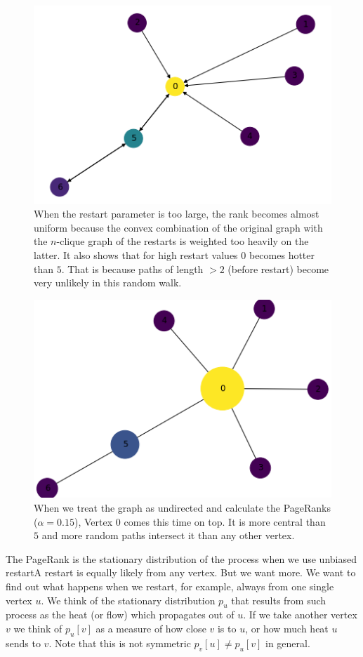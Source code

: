 \documentclass[a4paper,10pt]{article}
\newcommand{\gt}{>}
\theoremstyle{definition}
\theoremstyle{remark}
\theoremstyle{plain}
\begin{document}
\begin{figure}[!htb]
\begin{framed}
  \centering
    \includegraphics[width=0.55\linewidth]{directed_graph_example_tinyalpha.png}
  \caption{When the restart parameter is too large, the rank becomes almost
  uniform because the convex combination of the original graph with the
  $n$-clique graph of the restarts is weighted too heavily on the latter. It
  also shows that for high restart values $0$ becomes hotter than $5$. That is
  because paths of length $\gt 2$ (before restart) become very unlikely in this random walk.}
  \label{fig:weaklyconnectedpagedrankedbadly}
\end{framed}
\end{figure}

\begin{figure}[!htb]
\begin{framed}
  \centering
    \includegraphics[width=0.55\linewidth]{undirected_graph_example.png}
  \caption{When we treat the graph as undirected and calculate the PageRanks
  ($\alpha=0.15$),
  Vertex $0$ comes this time on top. It is more central than $5$ and
  more random paths intersect it than any other vertex.}
  \label{fig:undirectedanked}
\end{framed}
\end{figure}

The PageRank is the stationary distribution of the process when we use unbiased
restart\textemdash A restart is equally likely from any vertex.
But we want more. We want to find out what happens when we restart, for example,
always from one single vertex $u$. We think of the stationary distribution $p_u$ that 
results from such process as the heat (or flow) which propagates out of $u$.
If we take another vertex $v$ we think of $p_u[v]$ as a measure of how close $v$
is to $u$, or how much heat $u$ sends to $v$.
Note that this is not symmetric $p_v[u] \neq p_u[v]$ in general.
\end{document}
